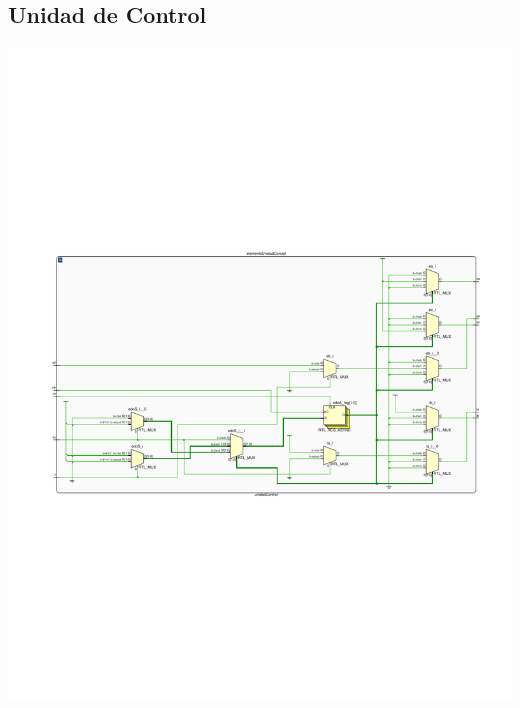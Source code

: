 \documentclass[8pt,executivepaper]{article}
\begin{document}
\subsection{Unidad de Control}
\begin{center}
  \includegraphics[scale=0.7]{rtl/unidadControl.pdf}
\end{center}
\end{document}
